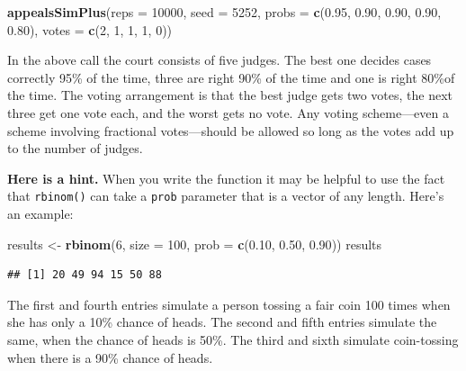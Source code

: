\documentclass[]{book}
\makeatletter
\newenvironment{Shaded}{\begin{snugshade}}{\end{snugshade}}
\newcommand{\KeywordTok}[1]{\textcolor[rgb]{0.13,0.29,0.53}{\textbf{#1}}}
\newcommand{\DataTypeTok}[1]{\textcolor[rgb]{0.13,0.29,0.53}{#1}}
\newcommand{\DecValTok}[1]{\textcolor[rgb]{0.00,0.00,0.81}{#1}}
\newcommand{\FloatTok}[1]{\textcolor[rgb]{0.00,0.00,0.81}{#1}}
\newcommand{\StringTok}[1]{\textcolor[rgb]{0.31,0.60,0.02}{#1}}
\newcommand{\NormalTok}[1]{#1}
\newenvironment{kframe}{%
\medskip{}
\setlength{\fboxsep}{.8em}
 \def\at@end@of@kframe{}%
 \ifinner\ifhmode%
  \def\at@end@of@kframe{\end{minipage}}%
  \begin{minipage}{\columnwidth}%
 \fi\fi%
 \def\FrameCommand##1{\hskip\@totalleftmargin \hskip-\fboxsep
 \colorbox{shadecolor}{##1}\hskip-\fboxsep
     \hskip-\linewidth \hskip-\@totalleftmargin \hskip\columnwidth}%
 \MakeFramed {\advance\hsize-\width
   \@totalleftmargin\z@ \linewidth\hsize
   \@setminipage}}%
 {\par\unskip\endMakeFramed%
 \at@end@of@kframe}
\renewenvironment{Shaded}{\begin{kframe}}{\end{kframe}}
\theoremstyle{definition}
\theoremstyle{definition}
\theoremstyle{definition}
\theoremstyle{remark}
\makeatother
\begin{document}
{\begin{enumerate}
\begin{Shaded}
\begin{Highlighting}[]
\KeywordTok{appealsSimPlus}\NormalTok{(}\DataTypeTok{reps =} \DecValTok{10000}\NormalTok{, }\DataTypeTok{seed =} \DecValTok{5252}\NormalTok{, }
               \DataTypeTok{probs =} \KeywordTok{c}\NormalTok{(}\FloatTok{0.95}\NormalTok{, }\FloatTok{0.90}\NormalTok{, }\FloatTok{0.90}\NormalTok{, }\FloatTok{0.90}\NormalTok{, }\FloatTok{0.80}\NormalTok{),}
               \DataTypeTok{votes =} \KeywordTok{c}\NormalTok{(}\DecValTok{2}\NormalTok{, }\DecValTok{1}\NormalTok{, }\DecValTok{1}\NormalTok{, }\DecValTok{1}\NormalTok{, }\DecValTok{0}\NormalTok{))}
\end{Highlighting}
\end{Shaded}

  In the above call the court consists of five judges. The best one
  decides cases correctly 95\% of the time, three are right 90\% of the
  time and one is right 80\%of the time. The voting arrangement is that
  the best judge gets two votes, the next three get one vote each, and
  the worst gets no vote. Any voting scheme---even a scheme involving
  fractional votes---should be allowed so long as the votes add up to
  the number of judges.

  \textbf{Here is a hint.} When you write the function it may be helpful
  to use the fact that \texttt{rbinom()} can take a \texttt{prob}
  parameter that is a vector of any length. Here's an example:

\begin{Shaded}
\begin{Highlighting}[]
\NormalTok{results <-}\StringTok{ }\KeywordTok{rbinom}\NormalTok{(}\DecValTok{6}\NormalTok{, }\DataTypeTok{size =} \DecValTok{100}\NormalTok{, }\DataTypeTok{prob =} \KeywordTok{c}\NormalTok{(}\FloatTok{0.10}\NormalTok{, }\FloatTok{0.50}\NormalTok{, }\FloatTok{0.90}\NormalTok{))}
\NormalTok{results}
\end{Highlighting}
\end{Shaded}

\begin{verbatim}
## [1] 20 49 94 15 50 88
\end{verbatim}

  The first and fourth entries simulate a person tossing a fair coin 100
  times when she has only a 10\% chance of heads. The second and fifth
  entries simulate the same, when the chance of heads is 50\%. The third
  and sixth simulate coin-tossing when there is a 90\% chance of heads.


\end{enumerate}}
\end{document}
